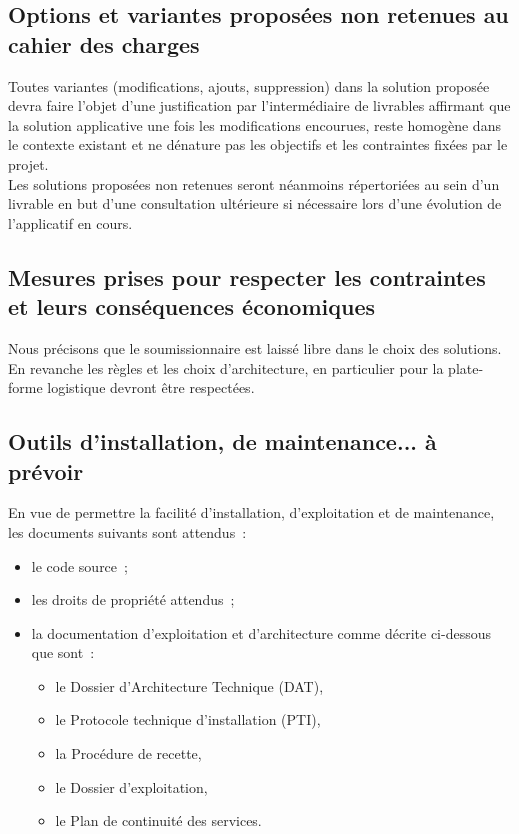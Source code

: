 \subsection{Options et variantes proposées non retenues au cahier des charges}
Toutes variantes (modifications, ajouts, suppression) dans la solution proposée devra faire l'objet d'une justification par l'intermédiaire de livrables affirmant que la solution applicative une fois les modifications encourues, reste homogène dans le contexte existant et ne dénature pas les objectifs et les contraintes fixées par le projet.
\\
Les solutions proposées non retenues seront néanmoins répertoriées au sein d'un livrable en but d'une consultation ultérieure si nécessaire lors d'une évolution de l'applicatif en cours.

\subsection{Mesures prises pour respecter les contraintes et leurs conséquences économiques}
Nous précisons que le soumissionnaire est laissé libre dans le choix des solutions. En revanche les règles et les choix d'architecture, en particulier pour la plate-forme logistique devront être respectées.

\subsection{Outils d'installation, de maintenance... à prévoir}
En vue de permettre la facilité d'installation, d'exploitation et de maintenance, les documents suivants sont attendus~:
\begin{itemize}
	\item le code source~;
	\item les droits de propriété attendus~;
	\item la documentation d'exploitation et d'architecture comme décrite ci-dessous que sont~:
	\begin{itemize}
		\item le Dossier d'Architecture Technique (DAT),
		\item le Protocole technique d'installation (PTI),
		\item la Procédure de recette,
		\item le Dossier d'exploitation,
		\item le Plan de continuité des services.
	\end{itemize}
\end{itemize}
